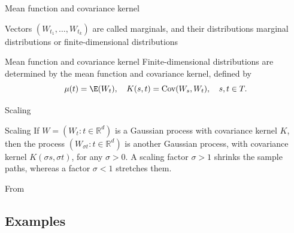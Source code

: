 \begin{frame}{Mean function and covariance kernel}

Vectors $(W_{t_1},\ldots,W_{t_k})$ are called \alert{marginals}, and their distributions \alert{marginal distributions} or \alert{finite-dimensional distributions}

\pause


\begin{block}{Mean function and covariance kernel}
Finite-dimensional distributions are determined by the \alert{mean function} and \alert{covariance kernel}, defined by
$$\mu(t) = \E (W_t), \quad 
K(s, t) = \text{Cov}(W_s, W_t), \quad s, t \in  T.$$
\end{block}
\end{frame}



\begin{frame}{Scaling}

\begin{alertblock}{Scaling}
If $W =(W_t: t \in \mathbb{R}^d)$ is a Gaussian process  with covariance kernel $K$, then the process $(W_{\sigma t}: t \in \mathbb{R}^d)$ is another Gaussian process, with covariance kernel $K(\sigma s, \sigma t)$, for any $\sigma  > 0$. A scaling factor $\sigma  > 1$ shrinks the sample paths, whereas a factor $\sigma  < 1$ stretches them.
\end{alertblock}

\pause

\begin{center}
\end{center}
\hfill From \citet{ghosal2017fundamentals}


\end{frame}


\subsection{Examples}


